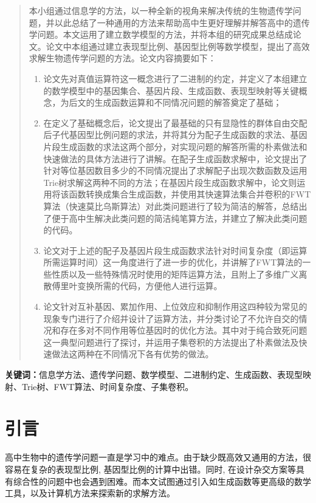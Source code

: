 \documentclass[12pt]{article} %
\begin{document}
\begin{abstract}
本小组通过信息学的方法，以一种全新的视角来解决传统的生物遗传学问题，并以此总结了一种通用的方法来帮助高中生更好理解并解答高中的遗传学问题。本文运用了建立数学模型的方法，并将本组的研究成果总结成论文。论文中本组通过建立表现型比例、基因型比例等数学模型，提出了高效求解生物遗传学问题的方法。论文内容摘要如下：
\begin{enumerate}
	\item 论文先对真值运算符这一概念进行了二进制的约定，并定义了本组建立的数学模型中的基因集合、基因片段、生成函数、表现型映射等关键概念，为后文的生成函数运算和不同情况问题的解答奠定了基础；
	\item 在定义了基础概念后，论文提出了最基础的只有显隐性的群体自由交配后子代基因型比例问题的求法，并将其分为配子生成函数的求法、基因片段生成函数的求法这两个部分，对实现问题的解答所需的朴素做法和快速做法的具体方法进行了讲解。在配子生成函数求解中，论文提出了针对等位基因数目多少的不同情况提出了求解配子出现次数函数及运用Trie树求解这两种不同的方法；在基因片段生成函数求解中，论文则运用将该函数转换成集合生成函数，并使用其快速算法集合并卷积的FWT算法（快速莫比乌斯算法）对此类问题进行了较为简洁的解答，总结出了便于高中生解决此类问题的简洁纯笔算方法，并建立了解决此类问题的代码。
	\item 论文对于上述的配子及基因片段生成函数求法针对时间复杂度（即运算所需运算时间）这一角度进行了进一步的优化，并讲解了FWT算法的一些性质以及一些特殊情况时使用的矩阵运算方法，且附上了多维广义离散傅里叶变换所需的代码，方便他人进行运算。
	\item 论文针对互补基因、累加作用、上位效应和抑制作用这四种较为常见的现象专门进行了介绍并设计了运算方法，并分类讨论了不允许自交的情况和存在多对不同作用等位基因时的优化方法。其中对于纯合致死问题这一典型问题进行了探讨，并运用子集卷积的方法提出了朴素做法及快速做法这两种在不同情况下各有优势的做法。
\end{enumerate}
\end{abstract}

\textbf{关键词：}信息学方法、遗传学问题、数学模型、二进制约定、生成函数、表现型映射、Trie树、FWT算法、时间复杂度、子集卷积。

\newpage

\section{引言}

高中生物中的遗传学问题一直是学习中的难点。由于缺少既高效又通用的方法，很容易在复杂的表现型比例, 基因型比例的计算中出错。同时, 在设计杂交方案等具有综合性的问题中也会遇到困难。而本文试图通过引入如生成函数等更高级的数学工具，以及计算机方法来探索新的求解方法。
\end{document}
